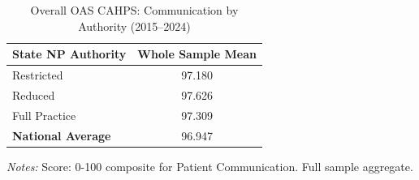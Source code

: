 \begin{table}[htbp]
    \centering
    \caption{Overall OAS CAHPS: Communication by Authority (2015--2024)}
    \label{tab:oas_grp1_full}
    \vspace{0.2cm}
    \begin{tabular}{lc}
        \toprule
        \textbf{State NP Authority} & \textbf{Whole Sample Mean} \\
        \midrule
        Restricted & 97.180 \\
        Reduced & 97.626 \\
        Full Practice & 97.309 \\
        \midrule
        \textbf{National Average} & 96.947 \\
        \bottomrule
    \end{tabular}
    \vspace{0.1cm}
    \begin{minipage}{0.6\textwidth}
        \footnotesize \textit{Notes:} Score: 0-100 composite for Patient Communication. Full sample aggregate.
    \end{minipage}
\end{table}